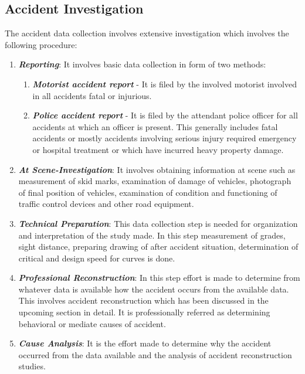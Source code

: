 \subsection{Accident Investigation}
The accident data collection involves extensive investigation which involves the following procedure:
\begin{enumerate}
	\item \textbf{\textit{Reporting}}: It involves basic data collection in form of two methods:
		\begin{enumerate}
			\item \textbf{\textit{Motorist accident report}} - It is filed by the involved motorist involved in all accidents fatal or injurious.
			\item \textbf{\textit{Police accident report}} - It is filed by the attendant police officer for all accidents at which an officer is present. This generally includes fatal accidents or mostly accidents involving serious injury required emergency or hospital treatment or which have incurred heavy property damage.
		\end{enumerate}
	\item \textbf{\textit{At Scene-Investigation}}: It involves obtaining information at scene such as measurement of skid marks, examination of damage of vehicles, photograph of final position of vehicles, examination of condition and functioning of traffic control devices and other road equipment.
	\item \textbf{\textit{Technical Preparation}}: This data collection step is needed for organization and interpretation of the study made. In this step measurement of grades, sight distance, preparing drawing of after accident situation, determination of critical and design speed for curves is done.
	\item \textbf{\textit{Professional Reconstruction}}: In this step effort is made to determine from whatever data is available how the accident occurs from the available data. This involves accident reconstruction which has been discussed in the upcoming section in detail. It is professionally referred as determining behavioral or mediate causes of accident.
	\item \textbf{\textit{Cause Analysis}}: It is the effort made to determine why the accident occurred from the data available and the analysis of accident reconstruction studies.
\end{enumerate}
